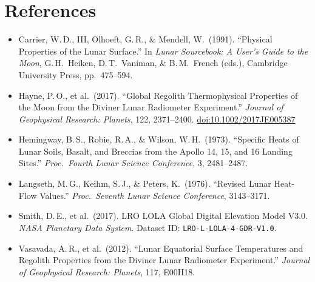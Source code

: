 \documentclass[12pt, a4paper]{article}
\begin{document}
\section{References}

\begin{itemize}[leftmargin=1.5em, itemsep=5pt]

  \item Carrier, W.\,D., III, Olhoeft, G.\,R., \& Mendell, W.\ (1991).
        ``Physical Properties of the Lunar Surface.''
        In \textit{Lunar Sourcebook: A User's Guide to the Moon},
        G.\,H.\ Heiken, D.\,T.\ Vaniman, \& B.\,M.\ French (eds.),
        Cambridge University Press, pp.\ 475--594.

  \item Hayne, P.\,O., et al.\ (2017).
        ``Global Regolith Thermophysical Properties of the Moon
        from the Diviner Lunar Radiometer Experiment.''
        \textit{Journal of Geophysical Research: Planets},
        122, 2371--2400.
        \href{https://doi.org/10.1002/2017JE005387}
             {doi:10.1002/2017JE005387}

  \item Hemingway, B.\,S., Robie, R.\,A., \& Wilson, W.\,H.\
        (1973). ``Specific Heats of Lunar Soils, Basalt, and
        Breccias from the Apollo 14, 15, and 16 Landing Sites.''
        \textit{Proc.\ Fourth Lunar Science Conference}, 3,
        2481--2487.

  \item Langseth, M.\,G., Keihm, S.\,J., \& Peters, K.\ (1976).
        ``Revised Lunar Heat-Flow Values.''
        \textit{Proc.\ Seventh Lunar Science Conference},
        3143--3171.

  \item Smith, D.\,E., et al.\ (2017).
        LRO LOLA Global Digital Elevation Model V3.0.
        \textit{NASA Planetary Data System}.
        Dataset ID: \texttt{LRO-L-LOLA-4-GDR-V1.0}.

  \item Vasavada, A.\,R., et al.\ (2012).
        ``Lunar Equatorial Surface Temperatures and Regolith
        Properties from the Diviner Lunar Radiometer Experiment.''
        \textit{Journal of Geophysical Research: Planets},
        117, E00H18.

\end{itemize}

\appendix
\end{document}
